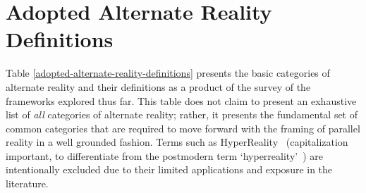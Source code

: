 \section{Adopted Alternate Reality Definitions}
\label{summaryofalternaterealitydefinitions}

Table \ref{adopted-alternate-reality-definitions} presents the basic categories of alternate reality and their definitions as a product of the survey of the frameworks explored thus far. This table does not claim to present an exhaustive list of \textit{all} categories of alternate reality; rather, it presents the fundamental set of common categories that are required to move forward with the framing of parallel reality in a well grounded fashion. Terms such as HyperReality~\cite{Terashima2001} (capitalization important, to differentiate from the postmodern term `hyperreality'~\cite{Baudrillard1994}) are intentionally excluded due to their limited applications and exposure in the literature.




